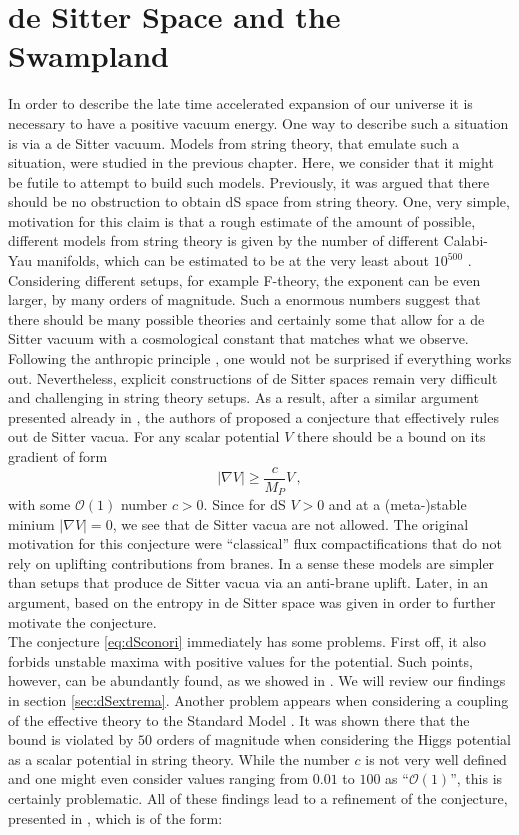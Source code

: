 \documentclass[a4paper,12pt,twoside,openright]{report}
\newcommand{\be}{\begin{equation}}
\newcommand{\ee}{\end{equation}}
\begin{document}
\section{de Sitter Space and the Swampland}
In order to describe the late time accelerated expansion of our universe it is necessary to have a positive vacuum energy. One way to describe such a situation is via a de Sitter vacuum. Models from string theory, that emulate such a situation, were studied in the previous chapter. Here, we consider that it might be futile to attempt to build such models. Previously, it was argued that there should be no obstruction to obtain dS space from string theory. One, very simple, motivation for this claim is that a rough estimate of the amount of possible, different models from string theory is given by the number of different Calabi-Yau manifolds, which can be estimated to be at the very least about $10^{500}$ \cite{Blumenhagen:2004xx}. Considering different setups, for example F-theory, the exponent can be even larger, by many orders of magnitude. Such a enormous numbers suggest that there should be many possible theories and certainly some that allow for a de Sitter vacuum with a cosmological constant that matches what we observe. Following the anthropic principle \cite{Weinberg:1987dv}, one would not be surprised if everything works out. Nevertheless, explicit constructions of de Sitter spaces remain very difficult and challenging in string theory setups. As a result, after a similar argument presented already in \cite{Danielsson:2018ztv}, the authors of \cite{Obied:2018sgi} proposed a conjecture that effectively rules out de Sitter vacua. For any scalar potential $V$ there should be a bound on its gradient of form
\be 
|\nabla V| \geq \frac{c}{M_P} V\,,
\label{eq:dSconori}
\ee
with some $\mathcal{O}(1)$ number $c>0$. Since for dS $V>0$ and at a (meta-)stable minium $|\nabla V| = 0$, we see that de Sitter vacua are not allowed. The original motivation for this conjecture were ``classical'' flux compactifications that do not rely on uplifting contributions from branes. In a sense these models are simpler than setups that produce de Sitter vacua via an anti-brane uplift. Later, in \cite{Ooguri:2018wrx} an argument, based on the entropy in de Sitter space was given in order to further motivate the conjecture.\\
The conjecture \eqref{eq:dSconori} immediately has some problems. First off, it also forbids unstable maxima with positive values for the potential. Such points, however, can be abundantly found, as we showed in \cite{Roupec:2018mbn}. We will review our findings in section \ref{sec:dSextrema}. Another problem appears when considering a coupling of the effective theory to the Standard Model \cite{Denef:2018etk}. It was shown there that the bound is violated by $50$ orders of magnitude when considering the Higgs potential as a scalar potential in string theory. While the number $c$ is not very well defined and one might even consider values ranging from $0.01$ to $100$ as ``$\mathcal{O}(1)$'', this is certainly problematic. All of these findings lead to a refinement of the conjecture, presented in \cite{Ooguri:2018wrx}, which is of the form:
\end{document}
